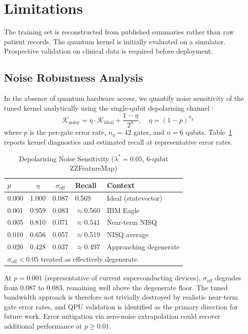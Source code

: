 \documentclass[11pt]{article}
\begin{document}
\section{Limitations}
The training set is reconstructed from published summaries rather than raw patient records. The quantum kernel is initially evaluated on a simulator. Prospective validation on clinical data is required before deployment.

\subsection{Noise Robustness Analysis}
\label{sec:noise}

In the absence of quantum hardware access, we quantify noise
sensitivity of the tuned kernel analytically using the single-qubit
depolarising channel \cite{nielsen2010}:
\begin{equation}
\mathcal{K}_{\text{noisy}} =
\eta \cdot \mathcal{K}_{\text{ideal}} + \frac{1-\eta}{2^n},
\quad \eta = (1-p)^{n_g}
\label{eq:noise}
\end{equation}
where $p$ is the per-gate error rate, $n_g = 42$ gates, and $n = 6$
qubits. Table~\ref{tab:noise} reports kernel diagnostics and
estimated recall at representative error rates.

\begin{table}[htbp]
\caption{Depolarising Noise Sensitivity ($\lambda^* = 0.05$, 6-qubit ZZFeatureMap)}
\label{tab:noise}
\begin{center}
\renewcommand{\arraystretch}{1.20}
\begin{tabular}{lccll}
\toprule
$p$ & $\eta$ & $\sigma_{\text{off}}$ & Recall & Context \\
\midrule
0.000 & 1.000 & 0.087 & 0.569 & Ideal (statevector) \\
0.001 & 0.959 & 0.083 & $\approx$0.560 & IBM Eagle \\
0.005 & 0.810 & 0.071 & $\approx$0.541 & Near-term NISQ \\
0.010 & 0.656 & 0.057 & $\approx$0.519 & NISQ average \\
0.020 & 0.428 & 0.037 & $\approx$0.497 & Approaching degenerate \\
\bottomrule
\multicolumn{5}{l}{\footnotesize $\sigma_{\text{off}} < 0.05$ treated as effectively degenerate.}
\end{tabular}
\end{center}
\end{table}

At $p = 0.001$ (representative of current superconducting devices),
$\sigma_{\text{off}}$ degrades from 0.087 to 0.083, remaining well
above the degenerate floor. The tuned bandwidth approach is therefore
not trivially destroyed by realistic near-term gate error rates, and
QPU validation is identified as the primary direction for future work.
Error mitigation via zero-noise extrapolation \cite{temme2017} could
recover additional performance at $p \geq 0.01$.
\end{document}
